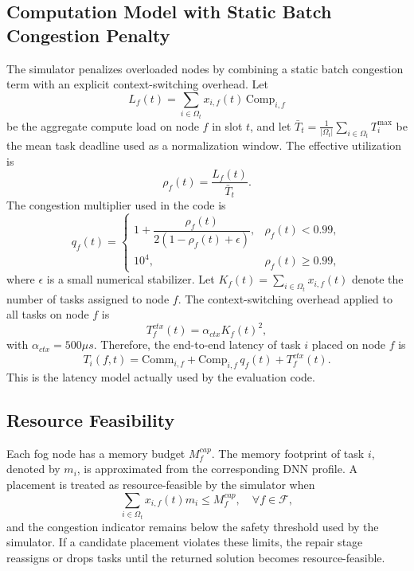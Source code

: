\subsection{Computation Model with Static Batch Congestion Penalty}
The simulator penalizes overloaded nodes by combining a static batch congestion term with an explicit context-switching overhead. Let
\begin{equation}
    L_f(t) = \sum_{i \in \Omega_t} x_{i,f}(t)\,\mathrm{Comp}_{i,f}
\end{equation}
be the aggregate compute load on node $f$ in slot $t$, and let $\bar{T}_t=\frac{1}{|\Omega_t|}\sum_{i \in \Omega_t} T_i^{\max}$ be the mean task deadline used as a normalization window. The effective utilization is
\begin{equation}
    \rho_f(t) = \frac{L_f(t)}{\bar{T}_t}.
\end{equation}
The congestion multiplier used in the code is
\begin{equation}
    q_f(t) =
    \begin{cases}
        1 + \dfrac{\rho_f(t)}{2(1-\rho_f(t)+\epsilon)}, & \rho_f(t) < 0.99,\\
        10^4, & \rho_f(t) \ge 0.99,
    \end{cases}
\end{equation}
where $\epsilon$ is a small numerical stabilizer. Let $K_f(t)=\sum_{i \in \Omega_t} x_{i,f}(t)$ denote the number of tasks assigned to node $f$. The context-switching overhead applied to all tasks on node $f$ is
\begin{equation}
    T_f^{ctx}(t) = \alpha_{ctx} K_f(t)^2,
\end{equation}
with $\alpha_{ctx}=500\mu s$. Therefore, the end-to-end latency of task $i$ placed on node $f$ is
\begin{equation}
    T_i(f,t) = \mathrm{Comm}_{i,f} + \mathrm{Comp}_{i,f}\, q_f(t) + T_f^{ctx}(t).
\end{equation}
This is the latency model actually used by the evaluation code.

\subsection{Resource Feasibility}
Each fog node has a memory budget $M_f^{cap}$. The memory footprint of task $i$, denoted by $m_i$, is approximated from the corresponding DNN profile. A placement is treated as resource-feasible by the simulator when
\begin{equation}
    \sum_{i \in \Omega_t} x_{i,f}(t) m_i \le M_f^{cap}, \quad \forall f \in \mathcal{F},
\end{equation}
and the congestion indicator remains below the safety threshold used by the simulator. If a candidate placement violates these limits, the repair stage reassigns or drops tasks until the returned solution becomes resource-feasible.

